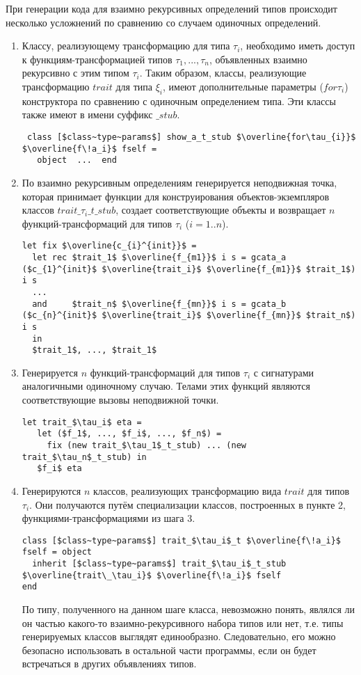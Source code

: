 \documentclass[acmsmall,review,anonymous]{acmart}\settopmatter{printfolios=true,printccs=false,printacmref=false}
\begin{document}
При генерации кода для взаимно рекурсивных определений типов происходит несколько усложнений по сравнению со случаем одиночных определений.

\begin{enumerate}
 \item Классу, реализующему трансформацию для типа $\tau_i$, необходимо иметь доступ к функциям-трансформацией типов $\tau_1,...,\tau_n$, объявленных взаимно рекурсивно с этим типом $\tau_i$. Таким образом, классы, реализующие трансформацию $trait$ для типа $\xi_i$, имеют дополнительные параметры ($f\!or\tau_{i}$) конструктора по сравнению с одиночным определением типа. Эти классы также имеют в имени суффикс $\_stub$.
 \begin{lstlisting}
 class [$class~type~params$] show_a_t_stub $\overline{for\tau_{i}}$ $\overline{f\!a_i}$ fself = 
   object  ...  end
\end{lstlisting}

 \item По взаимно рекурсивным определениям генерируется неподвижная точка, которая принимает функции для конструирования объектов-экземпляров классов $trait\_\tau_i\_t\_stub$, создает соответствующие объекты и возвращает $n$ функций-трансформаций для типов $\tau_i$ ($i=1..n$).

\begin{lstlisting}
let fix $\overline{c_{i}^{init}}$ =
  let rec $trait_1$ $\overline{f_{m1}}$ i s = gcata_a ($c_{1}^{init}$ $\overline{trait_i}$ $\overline{f_{m1}}$ $trait_1$) i s
  ...
  and     $trait_n$ $\overline{f_{mn}}$ i s = gcata_b ($c_{n}^{init}$ $\overline{trait_i}$ $\overline{f_{mn}}$ $trait_n$) i s 
  in
  $trait_1$, ..., $trait_1$
\end{lstlisting}
 
 \item Генерируется $n$ функций-трансформаций для типов $\tau_i$ с сигнатурами аналогичными одиночному случаю. Телами этих функций являются соответствующие вызовы неподвижной точки.
\begin{lstlisting}
let trait_$\tau_i$ eta = 
   let ($f_1$, ..., $f_i$, ..., $f_n$) = 
     fix (new trait_$\tau_1$_t_stub) ... (new trait_$\tau_n$_t_stub) in
   $f_i$ eta
\end{lstlisting} 

 \item Генерируются $n$ классов, реализующих трансформацию вида $trait$ для типов $\tau_i$. Они получаются путём специализации 
 классов, построенных в пункте 2, функциями-трансформациями из шага 3.
 \begin{lstlisting}
class [$class~type~params$] trait_$\tau_i$_t $\overline{f\!a_i}$ fself = object 
  inherit [$class~type~params$] trait_$\tau_i$_t_stub $\overline{trait\_\tau_i}$ $\overline{f\!a_i}$ fself
end
\end{lstlisting} 
По типу, полученного на данном шаге класса, невозможно понять, являлся ли он частью какого-то взаимно-рекурсивного набора типов или
нет, т.е. типы генерируемых классов выглядят единообразно. Следовательно, его можно безопасно использовать в остальной части программы, если он будет встречаться в других объявлениях типов.
\end{enumerate}
\end{document}
